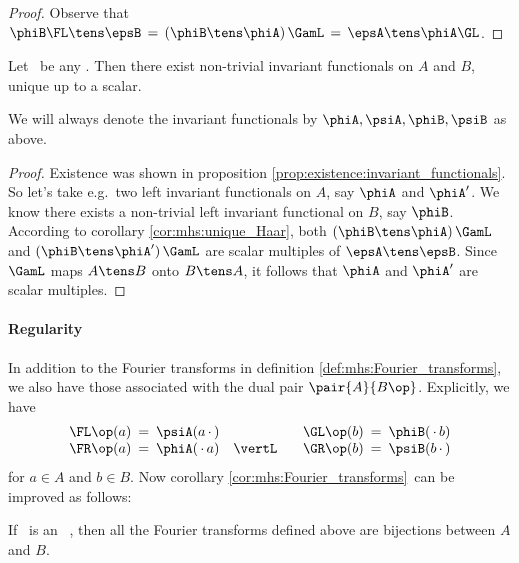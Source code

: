 \begin{proof}
Observe that
$\phiB \FL \tens \epsB  \,=\,  (\phiB \tens \phiA)\, \GamL  \,=\,   \epsA \tens \phiA \GL$.
\end{proof}


\begin{thm_sec}  \label{prop:mhs:invariant_functionals:exist:unique}
Let\/ \pairAB\ be any \mhs\@.
Then there exist non-trivial invariant functionals on $A$ and\/ $B$,
unique up to a scalar.

\rm
We will always denote the invariant functionals by $\phiA, \psiA, \phiB, \psiB$ as above.
\end{thm_sec}

\begin{proof}
Existence was shown in proposition \ref{prop:existence:invariant_functionals}\@.
So let's take e.g.\ two left invariant functionals on $A$, say $\phiA$ and $\phiA'$.
We know there exists a non-trivial left invariant functional on $B$, say $\phiB$.
According to corollary \ref{cor:mhs:unique_Haar}, both $(\phiB \tens \phiA)\, \GamL$
and $(\phiB \tens \phiA')\, \GamL$ are scalar multiples of $\epsA \tens \epsB$.
Since $\GamL$ maps $A \tens B$ onto $B \tens A$, it follows that
$\phiA$ and $\phiA'$ are scalar multiples.
\end{proof}



\paragraph{Regularity}
In addition to the Fourier transforms in definition \ref{def:mhs:Fourier_transforms},
we also have those associated with the dual pair $\pair{A}{B\op}$. Explicitly, we have
$$ \begin{array}{lll}
     \FL\op(a)  \:=\: \psiA(a\, \cdot \,)  & \hspace{4em}&
     \GL\op(b)  \:=\: \phiB(\, \cdot \,b) \\
     \FR\op(a)  \:=\: \phiA(\, \cdot \,a)   & \vertL &
     \GR\op(b)  \:=\: \psiB(b\, \cdot \,)
   \end{array} $$
for $a \in A$ and $b\in B$.
Now corollary \ref{cor:mhs:Fourier_transforms}\ can be improved as follows:


\begin{lemma_sec} \label{lem:mhs:Fourier_transforms:bijections}
If\/ \pairAB\ is an \mr\ \mhs, then all the Fourier transforms
defined above are bijections between $A$ and\/ $B$.
\end{lemma_sec}

